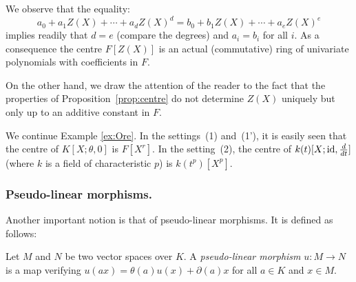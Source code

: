 \documentclass[a4paper]{llncs}
\newcommand{\id}{\textrm{\rm id}}
\begin{document}
We observe that the equality:
$$a_0 + a_1 Z(X) + \cdots + a_d Z(X)^d 
= b_0 + b_1 Z(X) + \cdots + a_e Z(X)^e$$
implies readily that $d = e$ (compare the degrees) and $a_i = b_i$ 
for all $i$. As a consequence the centre $F[Z(X)]$ is an actual
(commutative) ring of univariate polynomials with coefficients in $F$.

On the other hand, we draw the attention of the reader to the fact that 
the properties of Proposition~\ref{prop:centre} do not determine $Z(X)$ 
uniquely but only up to an additive constant in $F$.

{\small
\begin{example}
\label{ex:centre}
We continue Example \ref{ex:Ore}. In the settings~(1) and~(1'), it is 
easily seen that the centre of $K[X;\theta,0]$ is $F[X^r]$.
In the setting~(2), the centre of $k(t)[X; \id, \frac d{dt}]$ (where
$k$ is a field of characteristic $p$) is $k(t^p)[X^p]$. 
%
\end{example}}

\subsubsection*{Pseudo-linear morphisms.}

Another important notion is that of pseudo-linear morphisms. It is 
defined as follows:

\begin{definition}
Let $M$ and $N$ be two vector spaces over $K$.
A \emph{pseudo-linear morphism} $u : M\to N$ is a map verifying 
$u(ax) = \theta(a)u(x) + \partial(a)x$ for all $a \in K$ and $x \in M$.
\end{definition}
\end{document}
